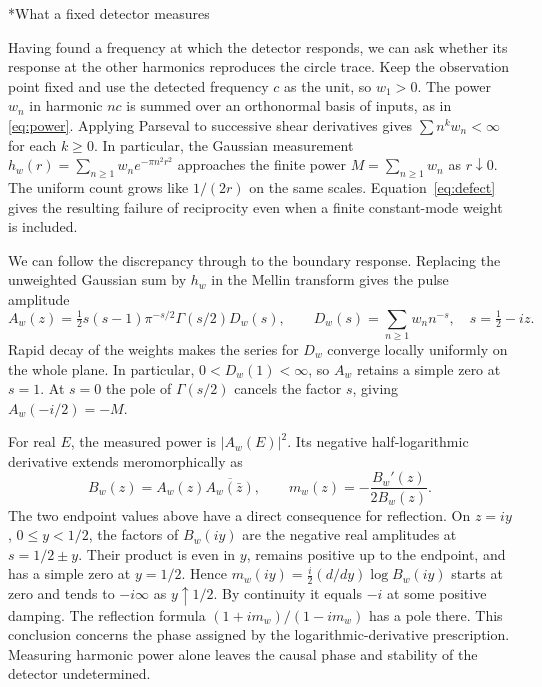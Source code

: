 \documentclass[11pt,letterpaper]{article}
\makeatletter
\renewcommand\subsection{\@startsection{subsection}{2}{\z@}{-2.0ex plus -.3ex}{.75ex}{\normalfont\normalsize\itshape}}
\numberwithin{equation}{section}
\makeatother
\begin{document}
\subsection*{What a fixed detector measures}

Having found a frequency at which the detector responds, we can ask whether its response at the other harmonics reproduces the circle trace. Keep the observation point fixed and use the detected frequency $c$ as the unit, so $w_1>0$. The power $w_n$ in harmonic $nc$ is summed over an orthonormal basis of inputs, as in \eqref{eq:power}. Applying Parseval to successive shear derivatives gives $\sum n^k w_n<\infty$ for each $k\geq0$. In particular, the Gaussian measurement $h_w(r)=\sum_{n\geq1}w_n e^{-\pi n^2r^2}$ approaches the finite power $M=\sum_{n\geq1}w_n$ as $r\downarrow0$. The uniform count grows like $1/(2r)$ on the same scales. Equation~\eqref{eq:defect} gives the resulting failure of reciprocity even when a finite constant-mode weight is included.

We can follow the discrepancy through to the boundary response. Replacing the unweighted Gaussian sum by $h_w$ in the Mellin transform gives the pulse amplitude
\[
 A_w(z)=\tfrac12s(s-1)\pi^{-s/2}\Gamma(s/2)D_w(s),\qquad
 D_w(s)=\sum_{n\geq1}w_nn^{-s},\quad s=\tfrac12-iz.
\]
Rapid decay of the weights makes the series for $D_w$ converge locally uniformly on the whole plane. In particular, $0<D_w(1)<\infty$, so $A_w$ retains a simple zero at $s=1$. At $s=0$ the pole of $\Gamma(s/2)$ cancels the factor $s$, giving $A_w(-i/2)=-M$.

For real $E$, the measured power is $|A_w(E)|^2$. Its negative half-logarithmic derivative extends meromorphically as
\[
 B_w(z)=A_w(z)\overline{A_w(\bar z)},\qquad m_w(z)=-\frac{B_w'(z)}{2B_w(z)}.
\]
The two endpoint values above have a direct consequence for reflection. On $z=iy$, $0\leq y<1/2$, the factors of $B_w(iy)$ are the negative real amplitudes at $s=1/2\pm y$. Their product is even in $y$, remains positive up to the endpoint, and has a simple zero at $y=1/2$. Hence $m_w(iy)=\tfrac i2(d/dy)\log B_w(iy)$ starts at zero and tends to $-i\infty$ as $y\uparrow1/2$. By continuity it equals $-i$ at some positive damping. The reflection formula $(1+im_w)/(1-im_w)$ has a pole there. This conclusion concerns the phase assigned by the logarithmic-derivative prescription. Measuring harmonic power alone leaves the causal phase and stability of the detector undetermined.
\end{document}
